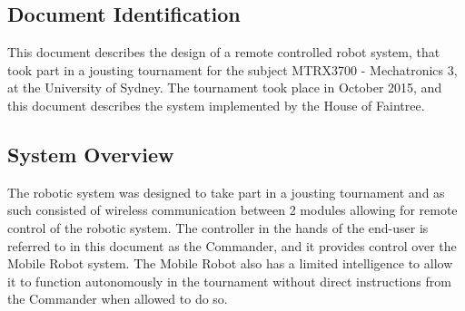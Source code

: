 \documentclass[MTRX3700report.tex]{subfiles}
\begin{document}
\subsection{Document Identification}
  This document describes the design of a remote controlled robot system, that took part in a jousting tournament for the subject MTRX3700 - Mechatronics 3, at the University of Sydney. The tournament took place in October 2015, and this document describes the system implemented by the House of Faintree.
\subsection{System Overview}
  The robotic system was designed to take part in a jousting tournament and as such consisted of wireless communication between 2 modules allowing for remote control of the robotic system. The controller in the hands of the end-user is referred to in this document as the Commander, and it provides control over the Mobile Robot system. The Mobile Robot also has a limited intelligence to allow it to function autonomously in the tournament without direct instructions from the Commander when allowed to do so.
\end{document}
